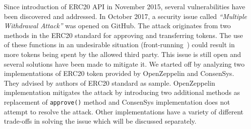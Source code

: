 

Since introduction of ERC20 API in November 2015, several vulnerabilities have been discovered and addressed. In October 2017, a security issue called \textit{``Multiple Withdrawal Attack''} was opened on GitHub\cite{Ref13,Ref07}. The attack originates from two methods in the ERC20 standard for approving and transferring tokens. The use of these functions in an undesirable situation (\eg front-running~\cite{eskandari2019sok}) could result in more tokens being spent by the allowed third party. This issue is still open and several solutions have been made to mitigate it. We started off by analyzing two implementations of ERC20 token provided by OpenZeppelin\cite{Ref10} and ConsenSys\cite{Ref11}. They advised by authors of ERC20 standard \cite{Ref08} as sample. OpenZeppelin implementation mitigates the attack by introducing two additional methods as replacement of \texttt{approve()} method and ConsenSys implementation does not attempt to resolve the attack. Other implementations have a variety of different trade-offs in solving the issue which will be discussed separately.

